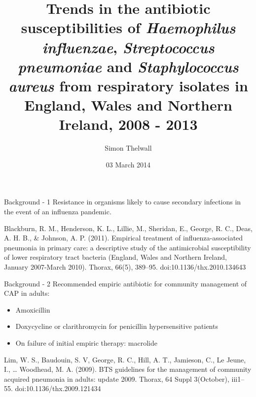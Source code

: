 \documentclass{beamer}
\title[Trends in susceptibility of \textit{H. influenzae}, \textit{S. pneumoniae} and \textit{S. aureus} from respiratory isolates]{Trends in the antibiotic susceptibilities of \textit{Haemophilus influenzae}, \textit{Streptococcus pneumoniae} and \textit{Staphylococcus aureus} from respiratory isolates in England, Wales and Northern Ireland, 2008 - 2013}
\subtitle{}
\author{Simon Thelwall}
\date{03 March 2014}
\begin{document}
{ %
\begin{frame}
\maketitle
\end{frame}
}
\addtocounter{framenumber}{-1}

\begin{frame}{Background - 1}
Resistance in organisms likely to cause secondary infections in the event of an influenza pandemic. 
\begin{thebibliography}{Blackburn et al, 2011}
{\footnotesize
Blackburn, R. M., Henderson, K. L., Lillie, M., Sheridan, E., George, R. C., Deas, A. H. B., \& Johnson, A. P. (2011). 
\newblock Empirical treatment of influenza-associated pneumonia in primary care: a descriptive study of the antimicrobial susceptibility of lower respiratory tract bacteria (England, Wales and Northern Ireland, January 2007-March 2010). 
\newblock Thorax, 66(5), 389–95. doi:10.1136/thx.2010.134643
}
\end{thebibliography}
\end{frame}

\begin{frame}{Background - 2}
Recommended empiric antibiotic for community management of CAP in adults:
\begin{itemize}
\item Amoxicillin 
\item Doxycycline or clarithromycin for penicillin hypersensitive patients
\item On failure of initial empiric therapy: macrolide
\end{itemize}
\begin{thebibliography}{Lim et al, 2009}
{\footnotesize
Lim, W. S., Baudouin, S. V, George, R. C., Hill, A. T., Jamieson, C., Le Jeune, I., … Woodhead, M. A. (2009). 
\newblock BTS guidelines for the management of community acquired pneumonia in adults: update 2009. 
\newblock Thorax, 64 Suppl 3(October), iii1–55. doi:10.1136/thx.2009.121434
}
\end{thebibliography}
\end{frame}
\end{document}
